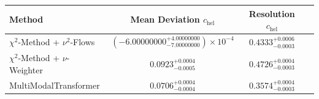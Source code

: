     \begin{tabular}{lccc}
        \toprule
        Method & Mean Deviation $c_{\text{hel}}$ & Resolution $c_{\text{hel}}$ \\
        \midrule
        $\chi^2$-Method + $\nu^2$-Flows & $(-6.00000000^{+4.00000000}_{-7.00000000})\times 10^{-4}$ & $0.4333^{+0.0006}_{-0.0003}$ \\
        $\chi^2$-Method + $\nu$-Weighter & $0.0923^{+0.0004}_{-0.0005}$ & $0.4726^{+0.0004}_{-0.0003}$ \\
        MultiModalTransformer & $0.0706^{+0.0004}_{-0.0004}$ & $0.3574^{+0.0004}_{-0.0003}$ \\
        \bottomrule
    \end{tabular}